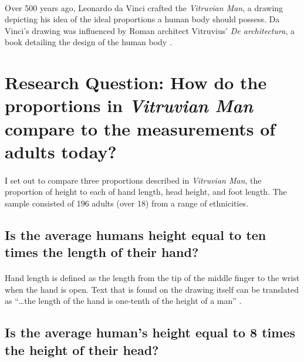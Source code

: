 \documentclass[]{article}
\begin{document}
\paragraph{}

Over 500 years ago, Leonardo da Vinci crafted the \emph{Vitruvian Man},
a drawing depicting his idea of the ideal proportions a human body
should possess. Da Vinci's drawing was influenced by Roman architect
Vitruvius' \emph{De architectura}, a book detailing the design of the
human body \citep{Wikipedia:Vitruvian}.

\section{Research Question: How do the proportions in \emph{Vitruvian Man} compare to the measurements of adults today?}
\label{sec:rq}

\paragraph{}

I set out to compare three proportions described in
\emph{Vitruvian Man}, the proportion of height to each of hand length,
head height, and foot length. The sample consisted of 196 adults (over
18) from a range of ethnicities.

\subsection{Is the average humans height equal to ten times the length of their hand?}
\paragraph{}

Hand length is defined as the length from the tip of the middle finger
to the wrist when the hand is open. Text that is found on the drawing
itself can be translated as ``\ldots the length of the hand is one-tenth
of the height of a man'' \citep{Wikipedia:Vitruvian}. \label{sec:rq2}

\subsection{Is the average human's height equal to 8 times the height of their head?}
\label{sec:rq3}
\paragraph{}
\end{document}
